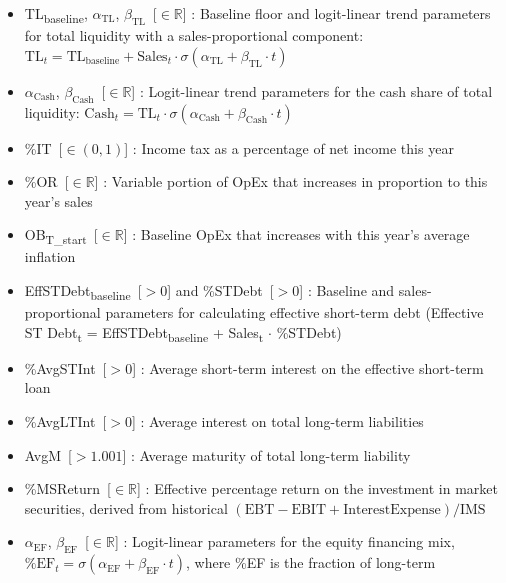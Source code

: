 \documentclass[12pt,a4paper]{article}
\begin{document}
\begin{itemize}
  \begin{itemize}
  \item
    logit(CR\textsubscript{t}) = ln ( CR\textsubscript{t} / (1 --
    CR\textsubscript{t}) ) = $\alpha$\textsubscript{CR} + $\beta$\textsubscript{CR} *
    t
  \end{itemize}
\item
  TL\textsubscript{baseline}, $\alpha_{\text{TL}}$, $\beta_{\text{TL}}$\, [$\in \mathbb{R}$] :
  Baseline floor and logit-linear trend parameters for total liquidity
  with a sales-proportional component:
  $\text{TL}_t = \text{TL}_{\text{baseline}} + \text{Sales}_t \cdot
  \sigma(\alpha_{\text{TL}} + \beta_{\text{TL}} \cdot t)$
\item
  $\alpha_{\text{Cash}}$, $\beta_{\text{Cash}}$\, [$\in \mathbb{R}$] :
  Logit-linear trend parameters for the cash share of total liquidity:
  $\text{Cash}_t = \text{TL}_t \cdot \sigma(\alpha_{\text{Cash}} +
  \beta_{\text{Cash}} \cdot t)$
\item
  \%IT\, [$\in(0,1)$] : Income tax as a percentage of net income this year
\item
  \%OR\, [$\in \mathbb{R}$] : Variable portion of OpEx that increases in proportion to this
  year's sales
\item
  OB\textsubscript{T\_start}\, [$\in \mathbb{R}$] : Baseline OpEx that increases with this
  year's average inflation
\item
  EffSTDebt\textsubscript{baseline}\, [$>0$] and \%STDebt\, [$>0$] : Baseline and
  sales-proportional parameters for calculating effective short-term
  debt (Effective ST Debt\textsubscript{t} = EffSTDebt\textsubscript{baseline}
  + Sales\textsubscript{t} $\cdot$ \%STDebt)
\item
  \%AvgSTInt\, [$>0$] : Average short-term interest on the effective short-term
  loan
\item
  \%AvgLTInt\, [$>0$] : Average interest on total long-term liabilities
\item
  AvgM\, [$>1.001$] : Average maturity of total long-term liability
\item
  \%MSReturn\, [$\in \mathbb{R}$] : Effective percentage return on the investment in market
  securities, derived from historical $(\text{EBT} - \text{EBIT} + \text{InterestExpense}) / \text{IMS}$
\item
  $\alpha_{\text{EF}}$, $\beta_{\text{EF}}$\, [$\in \mathbb{R}$] :
  Logit-linear parameters for the equity financing mix,
  $\text{\%EF}_t = \sigma(\alpha_{\text{EF}}
  + \beta_{\text{EF}} \cdot t)$, where \%EF is the fraction of long-term

\end{itemize}
\end{document}
